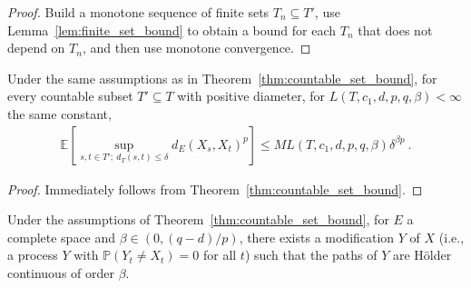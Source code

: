 \begin{proof}
Build a monotone sequence of finite sets $T_n \subseteq T'$, use Lemma~\ref{lem:finite_set_bound} to obtain a bound for each $T_n$ that does not depend on $T_n$, and then use monotone convergence.
\end{proof}


\begin{corollary}\label{cor:countable_set_bound_of_le}
Under the same assumptions as in Theorem~\ref{thm:countable_set_bound}, for every countable subset $T' \subseteq T$ with positive diameter, for $L(T, c_1, d, p, q, \beta) < \infty$ the same constant,
\begin{align*}
  \mathbb{E}\left[ \sup_{s, t \in T';\: d_T(s, t) \le \delta} d_E(X_s, X_t)^p \right]
  \le M L(T, c_1, d, p, q, \beta) \delta^{\beta p}
  \: .
\end{align*}
\end{corollary}

\begin{proof}
Immediately follows from Theorem~\ref{thm:countable_set_bound}.
\end{proof}


\begin{lemma}\label{lem:holder_modification_single}
  \leanok
Under the assumptions of Theorem~\ref{thm:countable_set_bound}, for $E$ a complete space and $\beta \in (0, (q - d)/p)$, there exists a modification $Y$ of $X$ (i.e., a process $Y$ with $\mathbb{P}(Y_t \ne X_t) = 0$ for all $t$) such that the paths of $Y$ are Hölder continuous of order $\beta$.
\end{lemma}

